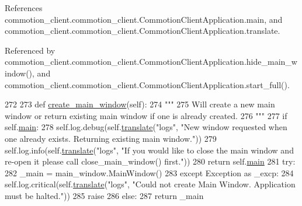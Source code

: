 References commotion\+\_\+client.\+commotion\+\_\+client.\+Commotion\+Client\+Application.\+main, and commotion\+\_\+client.\+commotion\+\_\+client.\+Commotion\+Client\+Application.\+translate.



Referenced by commotion\+\_\+client.\+commotion\+\_\+client.\+Commotion\+Client\+Application.\+hide\+\_\+main\+\_\+window(), and commotion\+\_\+client.\+commotion\+\_\+client.\+Commotion\+Client\+Application.\+start\+\_\+full().


\begin{DoxyCode}
272 
273     \textcolor{keyword}{def }\hyperlink{classcommotion__client_1_1commotion__client_1_1CommotionClientApplication_a726949d610a2bd566d1f3745b74c7b42}{create\_main\_window}(self):
274         \textcolor{stringliteral}{"""}
275 \textcolor{stringliteral}{        Will create a new main window or return existing main window if one is already created.}
276 \textcolor{stringliteral}{        """}
277         \textcolor{keywordflow}{if} self.\hyperlink{classcommotion__client_1_1commotion__client_1_1CommotionClientApplication_a4ae692cf60dc0a935cf2e8a72f657d1a}{main}:
278             self.log.debug(self.\hyperlink{classcommotion__client_1_1commotion__client_1_1CommotionClientApplication_a57e951c9b241fb0e0c70055b4ca1b6f7}{translate}(\textcolor{stringliteral}{"logs"}, \textcolor{stringliteral}{"New window requested when one already exists.
       Returning existing main window."}))
279             self.log.info(self.\hyperlink{classcommotion__client_1_1commotion__client_1_1CommotionClientApplication_a57e951c9b241fb0e0c70055b4ca1b6f7}{translate}(\textcolor{stringliteral}{"logs"}, \textcolor{stringliteral}{"If you would like to close the main window and
       re-open it please call close\_main\_window() first."}))
280             \textcolor{keywordflow}{return} self.\hyperlink{classcommotion__client_1_1commotion__client_1_1CommotionClientApplication_a4ae692cf60dc0a935cf2e8a72f657d1a}{main}
281         \textcolor{keywordflow}{try}:
282             \_main = main\_window.MainWindow()
283         \textcolor{keywordflow}{except} Exception \textcolor{keyword}{as} \_excp:
284             self.log.critical(self.\hyperlink{classcommotion__client_1_1commotion__client_1_1CommotionClientApplication_a57e951c9b241fb0e0c70055b4ca1b6f7}{translate}(\textcolor{stringliteral}{"logs"}, \textcolor{stringliteral}{"Could not create Main Window. Application
       must be halted."}))
285             \textcolor{keywordflow}{raise}
286         \textcolor{keywordflow}{else}:
287             \textcolor{keywordflow}{return} \_main

\end{DoxyCode}
